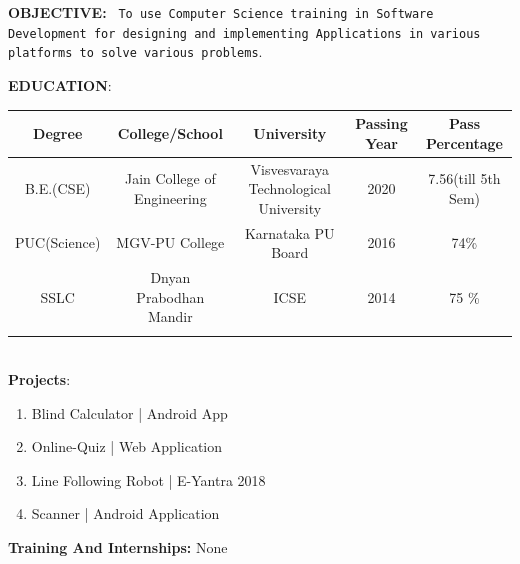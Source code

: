 \documentclass{article}
\begin{document}
		
\large \textbf{OBJECTIVE:}
	\texttt{	
	To use Computer Science training in Software Development for designing and implementing Applications in various platforms to solve various problems}.
\vspace{\baselineskip}
	
	\large \textbf{EDUCATION}:
	
	\begin{tabular}{|c|c|c|c|c|}
	\small Degree & \small College/School & \small University & \small Passing Year & \small Pass Percentage \\
		\hline
		\footnotesize  B.E.(CSE)  & \footnotesize Jain College of Engineering & \footnotesize Visvesvaraya Technological University & \footnotesize 2020 & \footnotesize 7.56(till 5th Sem) \\
		\footnotesize PUC(Science) & \footnotesize MGV-PU College & \footnotesize Karnataka PU Board & \footnotesize 2016 &\footnotesize 74\%  \\
		\footnotesize SSLC & \footnotesize Dnyan Prabodhan Mandir & \footnotesize ICSE & \footnotesize 2014 & \footnotesize 75 \%  \\

\vspace{\baselineskip}
	\end{tabular}
\\
	\large \textbf{Projects}:
	\begin{enumerate}
		\item Blind Calculator | Android App
		\item Online-Quiz | Web Application
		\item Line Following Robot | E-Yantra 2018
		\item Scanner | Android Application
		
		\vspace{\baselineskip}
	\end{enumerate}
	\large \textbf{Training And Internships:}	
	None
	
\end{document}
